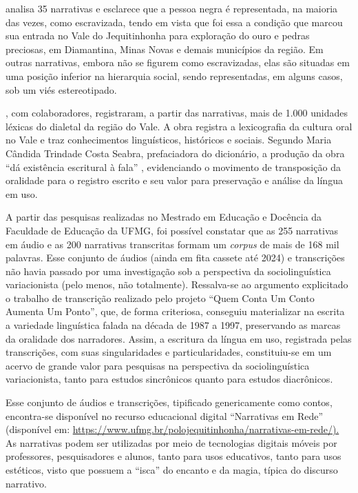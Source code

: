 \documentclass[portuguese]{textolivre}
\begin{document}
\textcite{Souza2014} analisa 35 narrativas e esclarece que a pessoa negra é representada, na maioria das vezes, como escravizada, tendo em vista que foi essa a condição que marcou sua entrada no Vale do Jequitinhonha para exploração do ouro e pedras preciosas, em Diamantina, Minas Novas e demais municípios da região. Em outras narrativas, embora não se figurem como escravizadas, elas são situadas em uma posição inferior na hierarquia social, sendo representadas, em alguns casos, sob um viés estereotipado.

\textcite{AntunesFerraz2013}, com colaboradores, registraram, a partir das narrativas, mais de 1.000 unidades léxicas do dialetal da região do Vale. A obra registra a lexicografia da cultura oral no Vale e traz conhecimentos linguísticos, históricos e sociais. Segundo Maria Cândida Trindade Costa Seabra, prefaciadora do dicionário, a produção da obra “dá existência escritural à fala” \cite[p. 11]{AntunesFerraz2013}, evidenciando o movimento de transposição da oralidade para o registro escrito e seu valor para preservação e análise da língua em uso.

A partir das pesquisas realizadas no Mestrado em Educação e Docência da Faculdade de Educação da UFMG, foi possível constatar que as 255 narrativas em áudio e as 200 narrativas transcritas formam um \textit{corpus} de mais de 168 mil palavras. Esse conjunto de áudios (ainda em fita cassete até 2024) e transcrições não havia passado por uma investigação sob a perspectiva da sociolinguística variacionista (pelo menos, não totalmente). Ressalva-se ao argumento explicitado o trabalho de transcrição realizado pelo projeto “Quem Conta Um Conto Aumenta Um Ponto”, que, de forma criteriosa, conseguiu materializar na escrita a variedade linguística falada na década de 1987 a 1997, preservando as marcas da oralidade dos narradores. Assim, a escritura da língua em uso, registrada pelas transcrições, com suas singularidades e particularidades, constituiu-se em um acervo de grande valor para pesquisas na perspectiva da sociolinguística variacionista, tanto para estudos sincrônicos quanto para estudos diacrônicos.

Esse conjunto de áudios e transcrições, tipificado genericamente como contos, encontra-se disponível no recurso educacional digital “Narrativas em Rede” (disponível em: \url{https://www.ufmg.br/polojequitinhonha/narrativas-em-rede/).} As narrativas podem ser utilizadas por meio de tecnologias digitais móveis por professores, pesquisadores e alunos, tanto para usos educativos, tanto para usos estéticos, visto que possuem a “isca” do encanto e da magia, típica do discurso narrativo.
\end{document}

